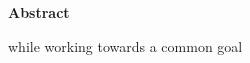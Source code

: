 \thispagestyle{empty}    %
\normalsize

\sffamily
\textbf{Abstract}

while working towards a common goal

\rmfamily
